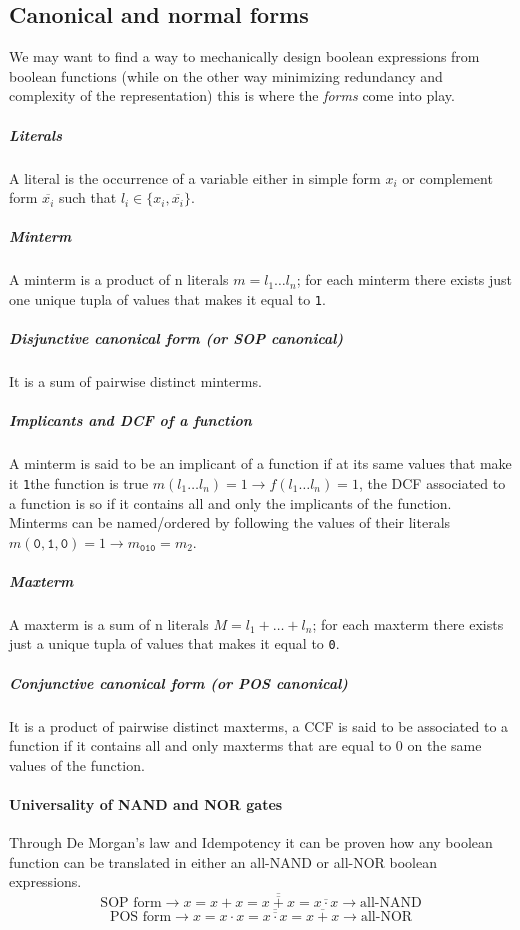 \documentclass{scrartcl}
\newcommand{\zero}{\texttt{0}}
\newcommand{\one}{\texttt{1}}
\begin{document}
    \subsection{Canonical and normal forms} We may want to find a way to mechanically design boolean expressions from boolean functions (while on the other way minimizing redundancy and complexity of the representation) this is where the \emph{forms} come into play.
    \subparagraph{Literals} A literal is the occurrence of a variable either in simple form $x_i$ or complement form $\overline{x_i}$ such that $l_i\in\{x_i,\overline{x_i}\}$.
    \subparagraph{Minterm} A minterm is a product of n literals $m=l_1\dots l_n$; for each minterm there exists just one unique tupla of values that makes it equal to \one.
    \subparagraph{Disjunctive canonical form (or SOP canonical)} It is a sum of pairwise distinct minterms.
    \subparagraph{Implicants and DCF of a function} A minterm is said to be an implicant of a function if at its same values that make it \one the function is true $m(l_1\dots l_n)=1\to f(l_1\dots l_n)=1$, the DCF associated to a function is so if it contains all and only the implicants of the function. Minterms can be named/ordered by following the values of their literals $m(\zero,\one,\zero)=1\to m_\texttt{010} = m_2$.
    \subparagraph{Maxterm} A maxterm is a sum of n literals $M=l_1+\dots+l_n$; for each maxterm there exists just a unique tupla of values that makes it equal to \zero.
    \subparagraph{Conjunctive canonical form (or POS canonical)} It is a product of pairwise distinct maxterms, a CCF is said to be associated to a function if it contains all and only maxterms that are equal to 0 on the same values of the function.
    \paragraph{Universality of NAND and NOR gates} Through De Morgan's law and Idempotency it can be proven how any boolean function can be translated in either an all-NAND or all-NOR boolean expressions.
     \begin{equation*}
        \textrm{SOP form}\to x=x+x=\overline{\overline{x+x}}=\overline{x\cdot x}\to \textrm{all-NAND}
     \end{equation*}
     \begin{equation*}
        \textrm{POS form}\to x=x\cdot x=\overline{\overline{x\cdot x}}=\overline{x+x}\to \textrm{all-NOR}
    \end{equation*}
\end{document}

